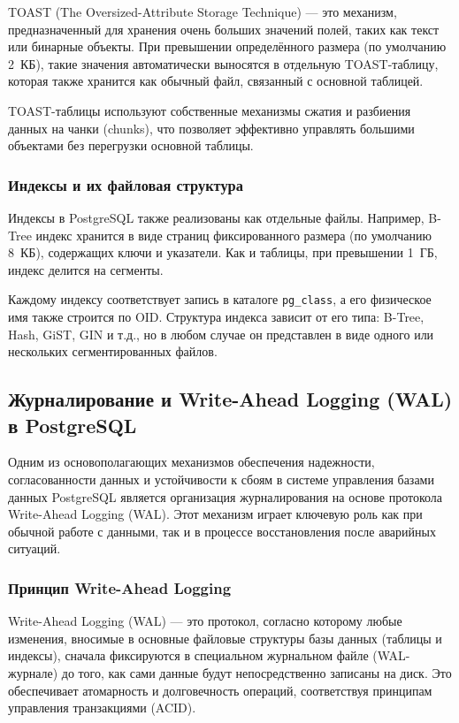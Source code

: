TOAST (The Oversized-Attribute Storage Technique) --- это механизм, предназначенный для хранения очень больших значений полей, 
таких как текст или бинарные объекты. При превышении определённого размера (по умолчанию 2~КБ), такие значения автоматически 
выносятся в отдельную TOAST-таблицу, которая также хранится как обычный файл, связанный с основной таблицей.

TOAST-таблицы используют собственные механизмы сжатия и разбиения данных на чанки (chunks), что позволяет эффективно управлять большими объектами без перегрузки основной таблицы.

\subsubsection{Индексы и их файловая структура}

Индексы в PostgreSQL также реализованы как отдельные файлы. Например, B-Tree индекс хранится в виде страниц фиксированного размера 
(по умолчанию 8~КБ), содержащих ключи и указатели. Как и таблицы, при превышении 1~ГБ, индекс делится на сегменты.

Каждому индексу соответствует запись в каталоге \texttt{pg\_class}, а его физическое имя также строится по OID. 
Структура индекса зависит от его типа: B-Tree, Hash, GiST, GIN и т.д., но в любом случае он представлен в виде одного или нескольких сегментированных файлов.

\subsection{Журналирование и Write-Ahead Logging (WAL) в PostgreSQL}

Одним из основополагающих механизмов обеспечения надежности, согласованности данных и устойчивости к сбоям в системе управления 
базами данных PostgreSQL является организация журналирования на основе протокола Write-Ahead Logging (WAL). 
Этот механизм играет ключевую роль как при обычной работе с данными, так и в процессе восстановления после аварийных ситуаций.

\subsubsection{Принцип Write-Ahead Logging}

Write-Ahead Logging (WAL) --- это протокол, согласно которому любые изменения, вносимые в основные файловые структуры базы данных (таблицы и индексы), 
сначала фиксируются в специальном журнальном файле (WAL-журнале) до того, как сами данные будут непосредственно записаны на диск. 
Это обеспечивает атомарность и долговечность операций, соответствуя принципам управления транзакциями (ACID). \cite{fiskov2025wal}

